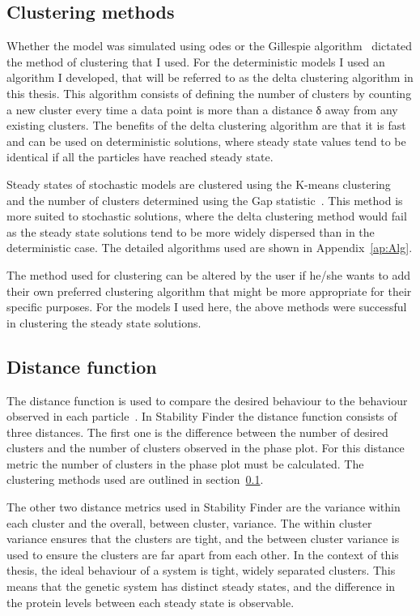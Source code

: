 \subsection{Clustering methods}
\label{Clustering methods}

Whether the model was simulated using \acrshort{ode}s or the Gillespie algorithm~\autocite{Gillespie:1977ww} dictated the method of clustering that I used. For the deterministic models I used an algorithm I developed, that will be referred to as the delta clustering algorithm in this thesis. This algorithm consists of defining the number of clusters by counting a new cluster every time a data point is more than a distance δ away from any existing clusters. The benefits of the delta clustering algorithm are that it is fast and can be used on deterministic solutions, where steady state values tend to be identical if all the particles have reached steady state.

Steady states of stochastic models are clustered using the K-means clustering~\autocite{Lloyd:1982wn} and the number of clusters determined using the Gap statistic~\autocite{Tibshirani:2001vo}. This method is more suited to stochastic solutions, where the delta clustering method would fail as the steady state solutions tend to be more widely dispersed than in the deterministic case. The detailed algorithms used are shown in Appendix~\ref{ap:Alg}. 

The method used for clustering can be altered by the user if he/she wants to add their own preferred clustering algorithm that might be more appropriate for their specific purposes. For the models I used here, the above methods were successful in clustering the steady state solutions. 

\subsection{Distance function}
\label{sec:dist}
 The distance function is used to compare the desired behaviour to the behaviour observed in each particle~\autocite{Toni:2009tr}. In Stability Finder the distance function consists of three distances. The first one is the difference between the number of desired clusters and the number of clusters observed in the phase plot. For this distance metric the number of clusters in the phase plot must be calculated. The clustering methods used are outlined in section~\ref{Clustering methods}.
 
 The other two distance metrics used in Stability Finder are the variance within each cluster and the overall, between cluster, variance. The within cluster variance ensures that the clusters are tight, and the between cluster variance is used to ensure the clusters are far apart from each other. In the context of this thesis, the ideal behaviour of a system is tight, widely separated clusters. This means that the genetic system has distinct steady states, and the difference in the protein levels between each steady state is observable.

